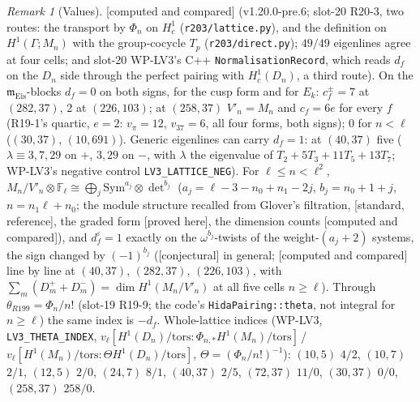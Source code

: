 \documentclass[11pt]{article}
\theoremstyle{remark}
\newtheorem{remark}[theorem]{Remark}
\newcommand{\F}{\mathbb{F}}
\newcommand{\Sym}{\mathrm{Sym}}
\newcommand{\Ga}{\Gamma}
\newcommand{\m}{\mathfrak{m}}
\newcommand{\Mn}{M_n}
\newcommand{\Dn}{D_n}
\newcommand{\PROVED}{\textsf{[proved here]}}
\newcommand{\STD}{\textsf{[standard, reference]}}
\newcommand{\CONJ}{\textsf{[conjectural]}}
\newcommand{\CMPD}{\textsf{[computed and compared]}}   %
\begin{document}
\begin{remark}[Values]\label{rmk:lvlatticevalues}
\CMPD{} (v1.20.0-pre.6; slot-20 R20-3, two routes: the transport by $\Phi_n$ on $H^{1}_c$ (\texttt{r203/lattice.py}), and the definition on $H^{1}(\Ga;\Mn)$ with the group-cocycle $T_p$
(\texttt{r203/direct.py}); $49/49$ eigenlines agree at four cells; and slot-20 WP-LV3's C++ \texttt{NormalisationRecord}, which reads $d_f$ on the $\Dn$ side through the perfect pairing with
$H^{1}_c(\Dn)$, a third route). On the $\m_{\mathrm{Eis}}$-blocks $d_f=0$ on both signs, for the cusp form and for $E_k$: $c^{\pm}_f=7$ at $(282,37)$, $2$ at $(226,103)$; at $(258,37)$ $V'_n=\Mn$ and
$c_f=6e$ for every $f$ (R19-1's quartic, $e=2$: $v_\pi=12$, $v_{37}=6$, all four forms, both signs); $0$ for $n<\ell$ ($(30,37)$, $(10,691)$). Generic eigenlines can carry $d_f=1$: at $(40,37)$ five
($\lambda\equiv3,7,29$ on $+$, $3,29$ on $-$, with $\lambda$ the eigenvalue of $T_2+5T_3+11T_5+13T_7$; WP-LV3's negative control \texttt{LV3\_LATTICE\_NEG}). For $\ell\le n<\ell^{2}$,
$\Mn/V'_n\otimes\F_\ell\cong\bigoplus_j\Sym^{a_j}\otimes{\det}^{b_j}$ ($a_j=\ell-3-n_0+n_1-2j$, $b_j=n_0+1+j$, $n=n_1\ell+n_0$; the module structure recalled from Glover's filtration, \STD, the graded form
\PROVED, the dimension counts \CMPD), and $d_f^{\varepsilon}=1$ exactly on the $\omega^{b_j}$-twists of the weight-$(a_j+2)$ systems, the sign changed by $(-1)^{b_j}$ (\CONJ{} in general; \CMPD{} line by
line at $(40,37)$, $(282,37)$, $(226,103)$, with $\sum_m(D_m^{+}+D_m^{-})=\dim H^{1}(\Mn/V'_n)$ at all five cells $n\ge\ell$). Through $\theta_{R199}=\Phi_n/n!$ (slot-19 R19-9; the code's
\texttt{HidaPairing::theta}, not integral for $n\ge\ell$) the same index is $-d_f$. Whole-lattice indices (WP-LV3, \texttt{LV3\_THETA\_INDEX},
$v_\ell[H^{1}(\Dn)/\mathrm{tors}:\Phi_{n,\ast}H^{1}(\Mn)/\mathrm{tors}]$\,/\,$v_\ell[H^{1}(\Mn)/\mathrm{tors}:\Theta H^{1}(\Dn)/\mathrm{tors}]$, $\Theta=(\Phi_n/n!)^{-1}$): $(10,5)$ $4/2$, $(10,7)$ $2/1$,
$(12,5)$ $2/0$, $(24,7)$ $8/1$, $(40,37)$ $2/5$, $(72,37)$ $11/0$, $(30,37)$ $0/0$, $(258,37)$ $258/0$.
\end{remark}
\end{document}

